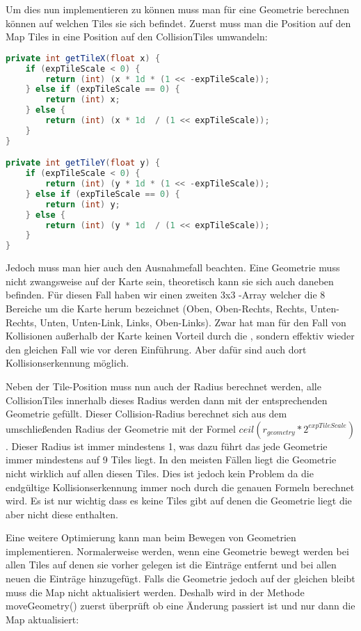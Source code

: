 Um dies nun implementieren zu können muss man für eine Geometrie berechnen können auf welchen Tiles sie sich befindet.
Zuerst muss man die Position auf den Map Tiles in eine Position auf den CollisionTiles umwandeln:

\doinline
\begin{lstlisting}[caption=Berechnen der CollisionMap-Position aus der Tile-Position, title=\hspace{0 pt}, language=java]
private int getTileX(float x) {
	if (expTileScale < 0) {
		return (int) (x * 1d * (1 << -expTileScale));		
	} else if (expTileScale == 0) {
		return (int) x;
	} else {
		return (int) (x * 1d  / (1 << expTileScale));
	}
}

private int getTileY(float y) {
	if (expTileScale < 0) {
		return (int) (y * 1d * (1 << -expTileScale));		
	} else if (expTileScale == 0) {
		return (int) y;
	} else {
		return (int) (y * 1d  / (1 << expTileScale));
	}
}
\end{lstlisting}

Jedoch muss man hier auch den Ausnahmefall beachten. Eine Geometrie muss nicht zwangsweise auf der Karte sein, theoretisch kann sie sich auch daneben befinden.
Für diesen Fall haben wir einen zweiten 3x3 -Array welcher die 8 Bereiche um die Karte herum bezeichnet (Oben, Oben-Rechts, Rechts, Unten-Rechts, Unten, Unten-Link, Links, Oben-Links). Zwar hat man für den Fall von Kollisionen außerhalb der Karte keinen Vorteil durch die , sondern effektiv wieder den gleichen Fall wie vor deren Einführung. Aber dafür sind auch dort Kollisionserkennung möglich.

Neben der Tile-Position muss nun auch der Radius berechnet werden, alle CollisionTiles innerhalb dieses Radius werden dann mit der entsprechenden Geometrie gefüllt. Dieser Collision-Radius berechnet sich aus dem umschließenden Radius der Geometrie mit der Formel $ceil(r_{geometry} * 2^{expTileScale})$.
Dieser Radius ist immer mindestens 1, was dazu führt das jede Geometrie immer mindestens auf 9 Tiles liegt. In den meisten Fällen liegt die Geometrie nicht wirklich auf allen diesen Tiles. Dies ist jedoch kein Problem da die endgültige Kollisionserkennung immer noch durch die genauen Formeln berechnet wird.
Es ist nur wichtig dass es keine Tiles gibt auf denen die Geometrie liegt die aber nicht diese enthalten.

Eine weitere Optimierung kann man beim Bewegen von Geometrien implementieren. Normalerweise werden, wenn eine Geometrie bewegt werden bei allen Tiles auf denen sie vorher gelegen ist die Einträge entfernt und bei allen neuen die Einträge hinzugefügt. Falls die Geometrie jedoch auf der gleichen  bleibt muss die Map nicht aktualisiert werden. Deshalb wird in der Methode moveGeometry() zuerst überprüft ob eine Änderung passiert ist und nur dann die Map aktualisiert:

